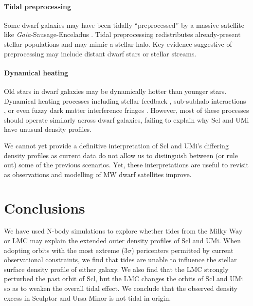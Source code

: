 \documentclass[linenumbers, twocolumn, twocolappendix]{aastex701}
\begin{document}
\paragraph{Tidal preprocessing} 
Some dwarf galaxies may have been tidally ``preprocessed'' by a massive satellite like \textit{Gaia}-Sausage-Enceladus
\citep[e.g.,][]{santistevan+2023, riley+2025}. 
Tidal preprocessing redistributes already-present stellar populations and may mimic a stellar halo. 
Key evidence suggestive of preprocessing may include distant dwarf stars or stellar streams.

\paragraph{Dynamical heating} 
Old stars in dwarf galaxies may be dynamically hotter than younger stars. Dynamical heating processes including
stellar feedback \citep[e.g.,][]{stinson+2009, maxwell+2012}, 
sub-subhalo interactions \citep{penarrubia+2025}, 
or even fuzzy dark matter interference fringes \citep[e.g.,][]{el-zant+2020}. 
However, most of these processes should operate similarly across dwarf galaxies, failing to explain why Scl and UMi have unusual density profiles.


We cannot yet provide a definitive interpretation of Scl and UMi's differing density profiles as current data do not allow us to distinguish between (or rule out) some of the previous scenarios. Yet, these interpretations are useful to revisit as observations and modelling of MW dwarf satellites improve.




\section{Conclusions } \label{sec:conclusions}

We have used N-body simulations to explore whether tides from the Milky Way or LMC may explain the extended outer density profiles  of Scl and UMi. 
When adopting orbits with the most extreme ($3\sigma$) pericenters permitted by current observational constraints, we find that tides are unable to influence the stellar surface density profile of either galaxy. 
We also find that the LMC strongly perturbed the past orbit of Scl, but the LMC changes the orbits of Scl and UMi so as to weaken the overall tidal effect. 
We conclude that the observed density excess in Sculptor and Ursa Minor is not tidal in origin. 
\end{document}
